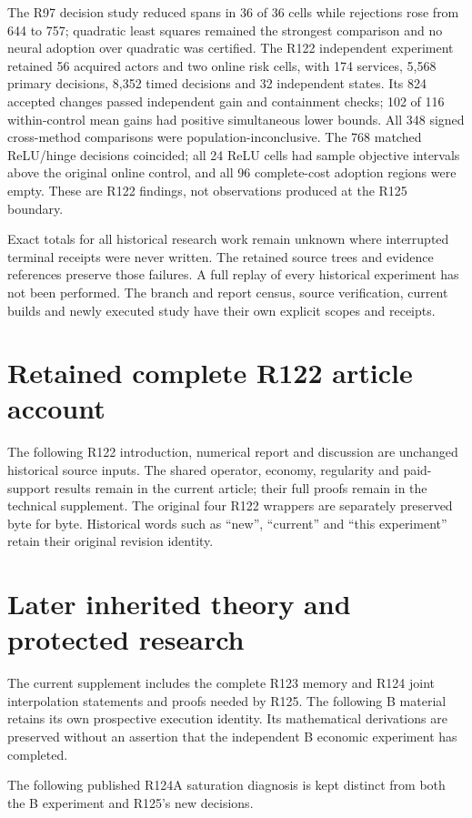 The R97 decision study reduced spans in 36 of 36 cells while rejections
rose from 644 to 757; quadratic least squares remained the strongest
comparison and no neural adoption over quadratic was certified. The R122
independent experiment retained 56 acquired actors and two online risk
cells, with 174 services, 5,568 primary decisions, 8,352 timed decisions
and 32 independent states. Its 824 accepted changes passed independent
gain and containment checks; 102 of 116 within-control mean gains had
positive simultaneous lower bounds. All 348 signed cross-method
comparisons were population-inconclusive. The 768 matched ReLU/hinge
decisions coincided; all 24 ReLU cells had sample objective intervals above
the original online control, and all 96 complete-cost adoption regions
were empty. These are R122 findings, not observations produced at the
R125 boundary.

Exact totals for all historical research work remain unknown where
interrupted terminal receipts were never written. The retained source
trees and evidence references preserve those failures. A full replay of
every historical experiment has not been performed. The branch and report
census, source verification, current builds and newly executed study have
their own explicit scopes and receipts.

\section{Retained complete R122 article account}\label{dev:retained122}
The following R122 introduction, numerical report and discussion are
unchanged historical source inputs. The shared operator, economy,
regularity and paid-support results remain in the current article;
their full proofs remain in the technical supplement. The original four
R122 wrappers are separately preserved byte for byte. Historical words
such as ``new'', ``current'' and ``this experiment'' retain their original
revision identity.




\section{Later inherited theory and protected research}
\label{dev:inherited123124}
The current supplement includes the complete R123 memory and R124 joint
interpolation statements and proofs needed by R125. The following B
material retains its own prospective execution identity. Its mathematical
derivations are preserved without an assertion that the independent B
economic experiment has completed.



The following published R124A saturation diagnosis is kept distinct from
both the B experiment and R125's new decisions.


